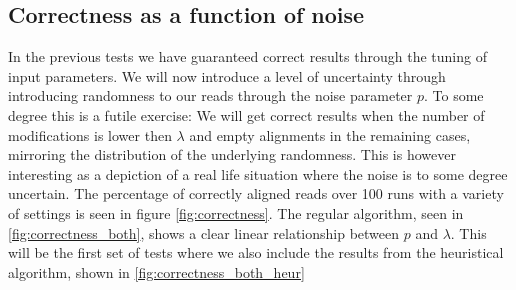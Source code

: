 \documentclass[thesis.tex]{subfiles}
\begin{document}
\subsection*{Correctness as a function of noise}
In the previous tests we have guaranteed correct results through the tuning of input parameters. We will now introduce a level of uncertainty through introducing randomness to our reads through the noise parameter $p$. To some degree this is a futile exercise: We will get correct results when the number of modifications is lower then $\lambda$ and empty alignments in the remaining cases, mirroring the distribution of the underlying randomness. This is however interesting as a depiction of a real life situation where the noise is to some degree uncertain. The percentage of correctly aligned reads over 100 runs with a variety of settings is seen in figure \ref{fig:correctness}. The regular algorithm, seen in \ref{fig:correctness_both}, shows a clear linear relationship between $p$ and $\lambda$. This will be the first set of tests where we also include the results from the heuristical algorithm, shown in \ref{fig:correctness_both_heur}
\end{document}
